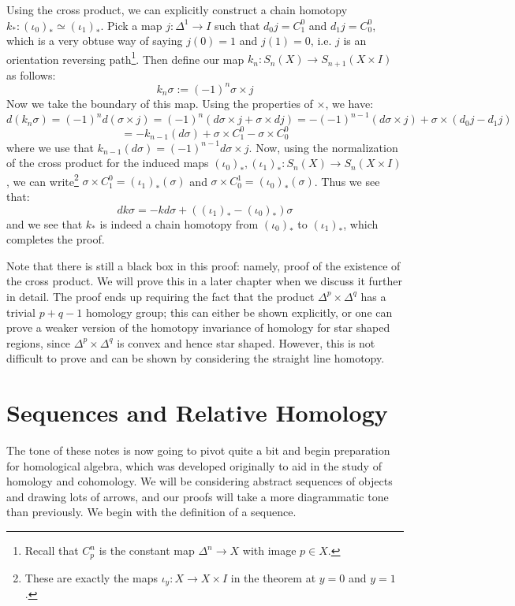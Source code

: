 \documentclass[11pt, oneside]{amsart}   	%
\theoremstyle{definition}
\begin{document}
Using the cross product, we can explicitly construct a chain homotopy $k_* : (\iota_0)_*\simeq (\iota_1)_*$. Pick 
a map $j : \Delta^1\rightarrow I$ such that $d_0 j = C_1^0$ and $d_1 j = C_0^0$, which is a very obtuse way of saying $j(0) = 
1$ and $j(1) = 0$, i.e. $j$ is an orientation reversing path\footnote{Recall that $C_p^n$ is the 
constant map $\Delta^n\rightarrow X$ with image $p\in X$.}. Then define our map $k_n : S_n(X)\rightarrow S_{n + 1}(X\times I)$ as follows:
\begin{equation}
	k_n\sigma := (-1)^n\sigma\times j
\end{equation}
Now we take the boundary of this map. Using the properties of $\times$, we have:
\[
	d(k_n\sigma) = (-1)^n d(\sigma\times j) = (-1)^n (d\sigma\times j + \sigma\times dj) = -(-1)^{n - 1} (d\sigma\times j) 
	+ \sigma\times (d_0j - d_1j)
\]
\[
	= -k_{n - 1}(d\sigma) + \sigma\times C_1^0 - \sigma\times C_0^0
\]
where we use that $k_{n - 1}(d\sigma) = (-1)^{n - 1} d\sigma\times j$. Now, using the normalization of the cross product 
for the induced maps $(\iota_0)_*, (\iota_1)_* : S_n(X)\rightarrow S_{n}(X\times I)$, we can write\footnote{These are exactly 
the maps $\iota_y : X\rightarrow X\times I$ in the theorem at $y = 0$ and $y = 1$.} $\sigma\times C_1^0 = (\iota_1)_*(\sigma)$ 
and $\sigma\times C_0^1 = (\iota_0)_*(\sigma)$. Thus we see that:
\begin{equation}
	dk\sigma = -kd\sigma + ((\iota_1)_* - (\iota_0)_*)\sigma
\end{equation}
and we see that $k_*$ is indeed a chain homotopy from $(\iota_0)_*$ to $(\iota_1)_*$, which completes the proof.

Note that there is still a black box in this proof: namely, proof of the existence of the cross product. We will prove this in a 
later chapter when we discuss it further in detail. The proof ends up requiring the fact that the product $\Delta^p\times\Delta^q$ 
has a trivial $p + q - 1$ homology group; this can either be shown explicitly, or one can prove a weaker version of the 
homotopy invariance of homology for star shaped regions, since $\Delta^p\times\Delta^q$ is convex and hence star shaped. 
However, this is not difficult to prove and can be shown by considering the straight line homotopy. 

\newpage
\section{Sequences and Relative Homology}
The tone of these notes is now going to pivot quite a bit and begin preparation for homological algebra, which was developed 
originally to aid in the study of homology and cohomology. We will be considering abstract sequences of objects and 
drawing lots of arrows, and our proofs will take a more diagrammatic tone than previously. We begin with the definition of 
a sequence.
\end{document}
